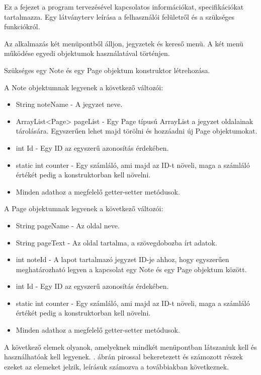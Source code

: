 
Ez a fejezet a program tervezésével kapcsolatos információkat, specifikációkat tartalmazza. Egy látványterv leírása a felhasználói felületről és a szükséges funkciókról.


Az alkalmazás két menüpontből álljon, jegyzetek és kereső menü. A két menü működése egyedi objektumok használatával történjen.

Szükséges egy Note és egy Page objektum konstruktor létrehozása.

A Note objektumnak legyenek a következő változói:
\begin{itemize}
	\item String noteName - A jegyzet neve.
	\item ArrayList<Page> pageList - Egy Page típusú ArrayList a jegyzet oldalainak tárolására. Egyszerűen lehet majd törölni és hozzáadni új Page objektumokat.
	\item int Id - Egy ID az egyszerű azonosítás érdekében.
	\item static int counter - Egy számláló, ami majd az ID-t növeli, maga a számláló értékét pedig a konstruktorban kell növelni.
	\item Minden adathoz a megfelelő getter-setter metódusok.
\end{itemize}

\vspace{10pt} \noindent A Page objektumnak legyenek a következő változói:
\begin{itemize}
	\item String pageName - Az oldal neve.
	\item String pageText - Az oldal tartalma, a szövegdobozba írt adatok.
	\item int noteId - A lapot tartalmazó jegyzet ID-je ahhoz, hogy egyszerűen meghatározható legyen a kapcsolat egy Note és egy Page objektum között.
	\item int Id - Egy ID az egyszerű azonosítás érdekében.
	\item static int counter - Egy számláló, ami majd az ID-t növeli, maga a számláló értékét pedig a konstruktorban kell növelni.
	\item Minden adathoz a megfelelő getter-setter metódusok.
\end{itemize}


A következő elemek olyanok, amelyeknek mindkét menüpontban látszaniuk kell és használhatóak kell legyenek. . ábrán pirossal bekeretezett és számozott részek ezeket az elemeket jelzik, leírásuk számozva a továbbiakban következnek.

